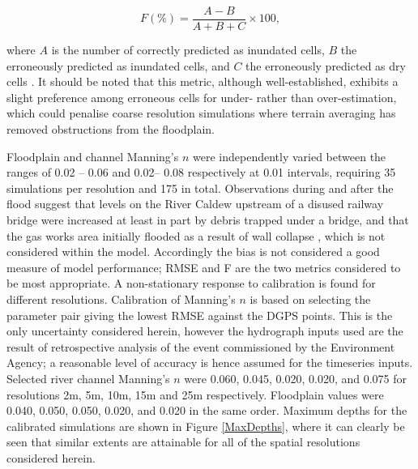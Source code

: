 \begin{equation}
	\label{FitStatistic}
	F (\%) = \frac{A - B}{A + B + C} \times 100,
\end{equation}

where \(A\) is the number of correctly predicted as inundated cells, \(B\) the erroneously predicted as inundated cells, and \(C\) the erroneously predicted as dry cells \citep[as in][]{Horritt2010}. It should be noted that this metric, although well-established, exhibits a slight preference among erroneous cells for under- rather than over-estimation, which could penalise coarse resolution simulations where terrain averaging has removed obstructions from the floodplain.

Floodplain and channel Manning's \(n\) were independently varied between the ranges of 0.02 -- 0.06 and 0.02-- 0.08 respectively at 0.01 intervals, requiring 35 simulations per resolution and 175 in total. Observations during and after the flood suggest that levels on the River Caldew upstream of a disused railway bridge were increased at least in part by debris trapped under a bridge, and that the gas works area initially flooded as a result of wall collapse \citep{EnvironmentAgency2006a,Fewtrell2011a}, which is not considered within the model. Accordingly the bias is not considered a good measure of model performance; RMSE and F are the two metrics considered to be most appropriate. A non-stationary response to calibration is found for different resolutions. Calibration of Manning's \(n\) is based on selecting the parameter pair giving the lowest RMSE against the DGPS points. This is the only uncertainty considered herein, however the hydrograph inputs used are the result of retrospective analysis of the event commissioned by the Environment Agency; a reasonable level of accuracy is hence assumed for the timeseries inputs. Selected river channel Manning's \(n\) were 0.060, 0.045, 0.020, 0.020, and 0.075 for resolutions 2m, 5m, 10m, 15m and 25m respectively. Floodplain values were 0.040, 0.050, 0.050, 0.020, and 0.020 in the same order. Maximum depths for the calibrated simulations are shown in Figure \ref{MaxDepths}, where it can clearly be seen that similar extents are attainable for all of the spatial resolutions considered herein. 

